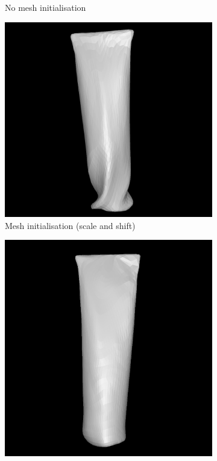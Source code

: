 \documentclass{article}
\begin{document}
\begin{figure}[h!]
\begin{subfigure}{.2\textwidth}
    \caption{No mesh initialisation}
    \label{results-moisturiser-mesh2}
  \end{subfigure}
  \hfill
  \begin{subfigure}{.2\textwidth}
    \centering
    \includegraphics[width=\textwidth]{images/moistmesh_b.png}
    \caption{Mesh initialisation (scale and shift)}
    \label{results-moisturiser-mesh3}
  \end{subfigure}
  \hfill
  \begin{subfigure}{.2\textwidth}
    \centering
    \includegraphics[width=\textwidth]{images/moistmesh_c.png}

\end{subfigure}
\end{figure}
\end{document}

